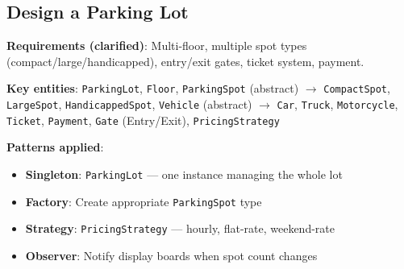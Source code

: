 \documentclass[11pt]{article}
\providecommand{\tightlist}{\setlength{\itemsep}{1pt}\setlength{\parskip}{0pt}}
\begin{document}
\subsection{Design a Parking Lot}\label{design-a-parking-lot}

\textbf{Requirements (clarified)}: Multi-floor, multiple spot types (compact/large/handicapped), entry/exit gates, ticket system, payment.

\textbf{Key entities}: \texttt{ParkingLot}, \texttt{Floor}, \texttt{ParkingSpot} (abstract) \(\rightarrow\) \texttt{CompactSpot}, \texttt{LargeSpot}, \texttt{HandicappedSpot}, \texttt{Vehicle} (abstract) \(\rightarrow\) \texttt{Car}, \texttt{Truck}, \texttt{Motorcycle}, \texttt{Ticket}, \texttt{Payment}, \texttt{Gate} (Entry/Exit), \texttt{PricingStrategy}

\textbf{Patterns applied}:

\begin{itemize}
\tightlist
\item
  \textbf{Singleton}: \texttt{ParkingLot} --- one instance managing the whole lot
\item
  \textbf{Factory}: Create appropriate \texttt{ParkingSpot} type
\item
  \textbf{Strategy}: \texttt{PricingStrategy} --- hourly, flat-rate, weekend-rate
\item
  \textbf{Observer}: Notify display boards when spot count changes
\end{itemize}

\end{document}
